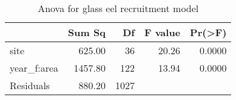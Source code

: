 \begin{table}[htbp]
\centering
\caption[table_anova]{Anova for glass eel recruitment model} 
\begin{tabularx}{0.8\textwidth}{lrrrr}
  \hline
 & Sum Sq & Df & F value & Pr(>F) \\ 
  \hline
site & 625.00 & 36 & 20.26 & 0.0000 \\ 
  year\_f:area & 1457.80 & 122 & 13.94 & 0.0000 \\ 
  Residuals & 880.20 & 1027 &  &  \\ 
   \hline
\end{tabularx}
\end{table}
